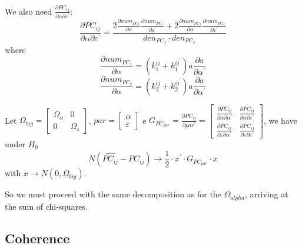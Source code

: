 \documentclass[a4paper,10pt]{article}
\begin{document}
We also need $\frac{\partial PC_{ij}}{\partial \alpha \partial \varepsilon^{'}}$:
\begin{equation}
\frac{\partial PC_{ij}}{\partial \alpha \partial \varepsilon^{'}} = \frac{2 \frac{\partial num_{PC_{1}}}{\partial \alpha} \frac{\partial num_{PC_{1}}}{\partial \varepsilon^{'}} + 2 \frac{\partial num_{PC_{2}}}{\partial \alpha} \frac{\partial num_{PC_{2}}}{\partial \varepsilon^{'}}}{den_{PC_{1}} \cdot den_{PC_{2}}}
\end{equation}
where
\begin{equation}
\frac{\partial num_{PC_{1}}}{\partial \alpha} = (k_{1}^{ij} + k_{1}^{ij^{'}}) a \frac{\partial a}{\partial \alpha^{'}}
\end{equation}
\begin{equation}
\frac{\partial num_{PC_{2}}}{\partial \alpha} = (k_{2}^{ij} + k_{2}^{ij^{'}}) a \frac{\partial a}{\partial \alpha^{'}}
\end{equation}

Let $\Omega_{big} = \left[ \begin{array}{cc} 
 \Omega_{\alpha} & 0 \\ 0 & \Omega_{\varepsilon}
\end{array} \right]$, $par = \left[ \begin{array}{c} 
 \alpha \\ \varepsilon
\end{array} \right]$ e $G_{PC_{par}} = \frac{\partial PC_{ij}}{\partial par^{'}} = \left[ \begin{array}{cc} 
\frac{\partial PC_{ij}}{\partial \alpha \partial \alpha^{'}} & 
\frac{\partial PC_{ij}}{\partial \alpha \partial \varepsilon^{'}} \\ 
\frac{\partial PC_{ij}}{\partial \varepsilon \partial \alpha^{'}} & 
\frac{\partial PC_{ij}}{\partial \varepsilon \partial \varepsilon^{'}}
\end{array} \right]$, we have under $H_0$
\begin{equation}
N (\hat{PC_{ij}} - PC_{ij}) \to \frac{1}{2} \cdot x^{'} \cdot G_{PC_{par}} \cdot x
\end{equation}
with $x \to N(0, \Omega_{big})$.

So we must proceed with the same decomposition as for the $\Omega_{alpha}$, arriving at the sum of chi-squares.

\subsection{Coherence}
\end{document}
